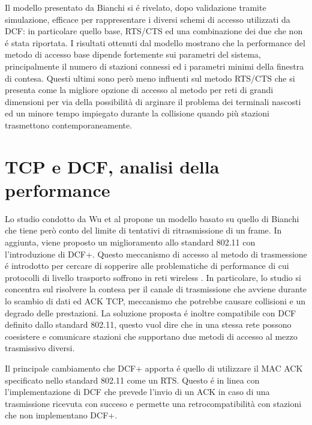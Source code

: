 Il modello presentato da Bianchi si \'e rivelato, dopo validazione tramite simulazione, efficace per rappresentare i diversi schemi di accesso utilizzati da DCF: in particolare quello base, RTS/CTS ed una combinazione dei due che non \'e stata riportata.
I risultati ottenuti dal modello mostrano che la performance del metodo di accesso base dipende fortemente sui parametri del sistema, principalmente il numero di stazioni connessi ed i parametri minimi della finestra di contesa.
Questi ultimi sono per\`o meno influenti sul metodo RTS/CTS che si presenta come la migliore opzione di accesso al metodo per reti di grandi dimensioni per via della possibilit\`a di arginare il problema dei terminali nascosti ed un minore tempo impiegato durante la collisione quando pi\`u stazioni trasmettono contemporaneamente.

\newpage

\section{TCP e DCF, analisi della performance }

Lo studio condotto da Wu et al \cite{wu2002performance} propone un modello basato su quello di Bianchi che tiene per\`o conto del limite di tentativi di ritrasmissione di un frame.
In aggiunta, viene proposto un miglioramento allo standard 802.11 con l'introduzione di DCF+.
Questo meccanismo di accesso al metodo di trasmessione \'e introdotto per cercare di sopperire alle problematiche di performance di cui protocolli di livello trasporto soffrono in reti wireless \cite{xylomenos1999tcp}.
In particolare, lo studio si concentra sul risolvere la contesa per il canale di trasmissione che avviene durante lo scambio di dati ed ACK TCP, meccanismo che potrebbe causare collisioni e un degrado delle prestazioni.
La soluzione proposta \'e inoltre compatibile con DCF definito dallo standard 802.11, questo vuol dire che in una stessa rete possono coesistere e comunicare stazioni che supportano due metodi di accesso al mezzo trasmissivo diversi.

Il principale cambiamento che DCF+ apporta \'e quello di utilizzare il MAC ACK specificato nello standard 802.11 come un RTS.
Questo \'e in linea con l'implementazione di DCF che prevede l'invio di un ACK in caso di una trasmissione ricevuta con succeso e permette una retrocompatibilit\`a con stazioni che non implementano DCF+.

